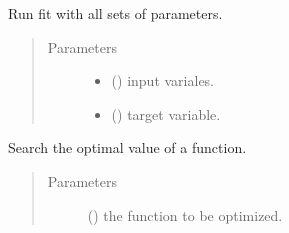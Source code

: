 \documentclass[letterpaper,10pt,english]{sphinxmanual}
\begin{document}
\begin{fulllineitems}
\begin{fulllineitems}
\label{\detokenize{apidoc:pysequd.sequd.SeqUD.fit}}
Run fit with all sets of parameters.
\begin{quote}\begin{description}
\item[{Parameters}] \leavevmode\begin{itemize}
\item {} 
 (\sphinxstyleliteralemphasis{\sphinxupquote{, }}\sphinxstyleliteralemphasis{\sphinxupquote{ {[}}}\sphinxstyleliteralemphasis{\sphinxupquote{, }}\sphinxstyleliteralemphasis{\sphinxupquote{{]}}}) \textendash{} input variales.

\item {} 
 (\sphinxstyleliteralemphasis{\sphinxupquote{, }}\sphinxstyleliteralemphasis{\sphinxupquote{ {[}}}\sphinxstyleliteralemphasis{\sphinxupquote{{]} or }}\sphinxstyleliteralemphasis{\sphinxupquote{{[}}}\sphinxstyleliteralemphasis{\sphinxupquote{, }}\sphinxstyleliteralemphasis{\sphinxupquote{{]}}}\sphinxstyleliteralemphasis{\sphinxupquote{, }}) \textendash{} target variable.

\end{itemize}

\end{description}\end{quote}

\end{fulllineitems}


\begin{fulllineitems}
\label{\detokenize{apidoc:pysequd.sequd.SeqUD.fmin}}
Search the optimal value of a function.
\begin{quote}\begin{description}
\item[{Parameters}] \leavevmode
{} () \textendash{} the function to be optimized.


\end{description}
\end{quote}
\end{fulllineitems}
\end{fulllineitems}
\end{document}
